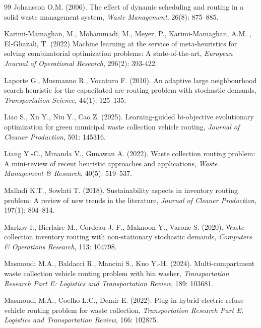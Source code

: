\documentclass[preprint,11pt,authoryear]{elsarticle}
\begin{document}
\begin{thebibliography}{99}
Johansson O.M. (2006). The effect of dynamic scheduling and routing in a solid waste management system, \textit{Waste Management}, 26(8): 875--885.

Karimi-Mamaghan, M., Mohammadi, M., Meyer, P., Karimi-Mamaghan, A.M.
, El-Ghazali, T. (2022) Machine learning at the service of meta-heuristics for solving combinatorial optimization problems: A state-of-the-art, \textit{European Journal of Operational Research}, 296(2): 393-422.

Laporte G., Musmanno R., Vocaturo F. (2010). An adaptive large neighbourhood search heuristic for the capacitated arc-routing
problem with stochastic demands, \textit{Transportation Science}, 44(1): 125--135.

Liao S., Xu Y., Niu Y., Cao Z. (2025). Learning-guided bi-objective evolutionary optimization for green municipal waste collection vehicle routing, \textit{Journal of Cleaner Production}, 501: 145316.

Liang  Y.-C., Minanda V., Gunawan A. (2022).  Waste collection routing problem:  A mini-review of recent heuristic approaches and applications, \textit{Waste Management \& Research}, 40(5): 519--537.

Malladi K.T., Sowlati T. (2018). Sustainability aspects in inventory routing problem: A review of new trends in the literature, \textit{Journal of Cleaner Production}, 197(1): 804--814.

Markov I., Bierlaire M., Cordeau J.-F., Maknoon Y., Varone S. (2020). Waste collection inventory routing with non-stationary stochastic demands, \textit{Computers \& Operations Research}, 113: 104798. 

Masmoudi M.A.,  Baldacci R., Mancini S., Kuo Y.-H. (2024). Multi-compartment waste collection vehicle routing problem with bin washer,  \textit{Transportation Research Part E: Logistics and Transportation Review}, 189: 103681.

Masmoudi M.A., Coelho L.C., Demir E. (2022). Plug-in hybrid electric refuse vehicle routing problem for waste collection,  \textit{Transportation Research Part E: Logistics and Transportation Review}, 166: 102875.


\end{thebibliography}
\end{document}
